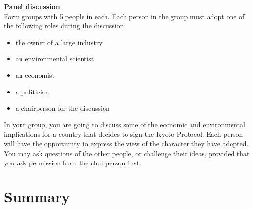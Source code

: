 {\textbf{Panel discussion}\\

Form groups with 5 people in each. Each person in the group must adopt one of the following roles during the discussion:
\begin{itemize}
\item{the owner of a large industry}
\item{an environmental scientist}
\item{an economist}
\item{a politician}
\item{a chairperson for the discussion}
\end{itemize}

In your group, you are going to discuss some of the economic and environmental implications for a country that decides to  sign the Kyoto Protocol. Each person will have the opportunity to express the view of the character they have adopted. You may ask questions of the other people, or challenge their ideas, provided that you ask permission from the chairperson first.
}

\section{Summary}


